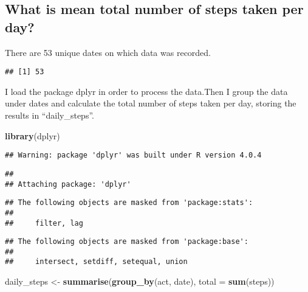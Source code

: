 \documentclass[
]{article}
\newenvironment{Shaded}{\begin{snugshade}}{\end{snugshade}}
\newcommand{\DataTypeTok}[1]{\textcolor[rgb]{0.13,0.29,0.53}{#1}}
\newcommand{\KeywordTok}[1]{\textcolor[rgb]{0.13,0.29,0.53}{\textbf{#1}}}
\newcommand{\NormalTok}[1]{#1}
\newcommand{\OperatorTok}[1]{\textcolor[rgb]{0.81,0.36,0.00}{\textbf{#1}}}
\newcommand{\StringTok}[1]{\textcolor[rgb]{0.31,0.60,0.02}{#1}}
\begin{document}
\hypertarget{what-is-mean-total-number-of-steps-taken-per-day}{%
\subsection{What is mean total number of steps taken per
day?}\label{what-is-mean-total-number-of-steps-taken-per-day}}

There are 53 unique dates on which data was recorded.

\begin{Shaded}
\end{Shaded}

\begin{verbatim}
## [1] 53
\end{verbatim}

I load the package dplyr in order to process the data.Then I group the
data under dates and calculate the total number of steps taken per day,
storing the results in ``daily\_steps''.

\begin{Shaded}
\begin{Highlighting}[]
\KeywordTok{library}\NormalTok{(dplyr)}
\end{Highlighting}
\end{Shaded}

\begin{verbatim}
## Warning: package 'dplyr' was built under R version 4.0.4
\end{verbatim}

\begin{verbatim}
## 
## Attaching package: 'dplyr'
\end{verbatim}

\begin{verbatim}
## The following objects are masked from 'package:stats':
## 
##     filter, lag
\end{verbatim}

\begin{verbatim}
## The following objects are masked from 'package:base':
## 
##     intersect, setdiff, setequal, union
\end{verbatim}

\begin{Shaded}
\begin{Highlighting}[]
\NormalTok{daily_steps <-}\StringTok{ }\KeywordTok{summarise}\NormalTok{(}\KeywordTok{group_by}\NormalTok{(act, date), }\DataTypeTok{total =} \KeywordTok{sum}\NormalTok{(steps))}
\end{Highlighting}
\end{Shaded}
\end{document}
